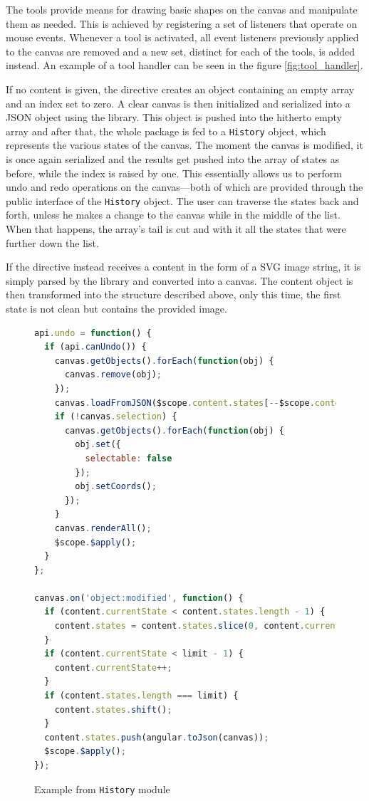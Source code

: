 \documentclass[thesis=M,english,hidelinks]{FITthesis}[2012/10/20]
\newcommand{\code}{\texttt}
\begin{document}
The tools provide means for drawing basic shapes on the canvas and manipulate them as needed. This is achieved by registering a set of listeners that operate on mouse events. Whenever a tool is activated, all event listeners previously applied to the canvas are removed and a new set, distinct for each of the tools, is added instead. An example of a tool handler can be seen in the figure \ref{fig:tool_handler}.

If no content is given, the directive creates an object containing an empty array and an index set to zero. A clear canvas is then initialized and serialized into a JSON object using the library. This object is pushed into the hitherto empty array and after that, the whole package is fed to a \code{History} object, which represents the various states of the canvas. The moment the canvas is modified, it is once again serialized and the results get pushed into the array of states as before, while the index is raised by one. This essentially allows us to perform undo and redo operations on the canvas---both of which are provided through the public interface of the \code{History} object. The user can traverse the states back and forth, unless he makes a change to the canvas while in the middle of the list. When that happens, the array's tail is cut and with it all the states that were further down the list.

If the directive instead receives a content in the form of a SVG image string, it is simply parsed by the library and converted into a canvas. The content object is then transformed into the structure described above, only this time, the first state is not clean but contains the provided image.

\begin{figure}
  \begin{lstlisting}[language=JavaScript]
api.undo = function() {
  if (api.canUndo()) {
    canvas.getObjects().forEach(function(obj) {
      canvas.remove(obj);
    });
    canvas.loadFromJSON($scope.content.states[--$scope.content.currentState]);
    if (!canvas.selection) {
      canvas.getObjects().forEach(function(obj) {
        obj.set({
          selectable: false
        });
        obj.setCoords();
      });
    }
    canvas.renderAll();
    $scope.$apply();
  }
};

canvas.on('object:modified', function() {
  if (content.currentState < content.states.length - 1) {
    content.states = content.states.slice(0, content.currentState + 1);
  }
  if (content.currentState < limit - 1) {
    content.currentState++;
  }
  if (content.states.length === limit) {
    content.states.shift();
  }
  content.states.push(angular.toJson(canvas));
  $scope.$apply();
});
  \end{lstlisting}
  \caption{Example from \code{History} module}
  \label{fig:history_module}
\end{figure}
\end{document}

